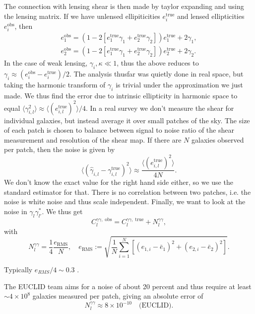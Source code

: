 \documentclass[11pt]{article} %
\newcommand{\br}[1]{\ensuremath{\left( #1 \right)}}
\newcommand{\sbr}[1]{\ensuremath{\left[ #1 \right]}}
\begin{document}
The connection with lensing shear is then made by taylor expanding and using the lensing matrix. If we have unlensed ellipiticities $e_i^\text{true}$ and lensed ellipticities $e_i^{\text{obs}}$, then \cite{dodelson_modern_cosmology}
\begin{gather*}
	e_1^{\text{obs}} = \br{1-2\sbr{e_1^{\text{true}}\gamma_1+e_2^{\text{true}}\gamma_2}}e_1^{\text{true}} + 2\gamma_1,\\
	e_2^{\text{obs}} = \br{1-2\sbr{e_1^{\text{true}}\gamma_1+e_2^{\text{true}}\gamma_2}}e_2^{\text{true}} + 2\gamma_2.
\end{gather*}
In the case of weak lensing, $\gamma_i, \kappa \ll 1$, thus the above reduces to $\gamma_i \approx (e_i^{\text{obs}} - e^{\text{true}}_i)/2$. The analysis thusfar was quietly done in real space, but taking the harmonic transform of $\gamma_i$ is trivial under the approximation we just made. We thus find the error due to intrinsic ellipticity in harmonic space to equal $ \langle \gamma_{i,l}^2\rangle \approx \langle \br{e_{i,l}^\text{true}}^2\rangle/4$. In a real survey we don't measure the shear for individual galaxies, but instead average it over small patches of the sky. The size of each patch is chosen to balance between signal to noise ratio of the shear measurement and resolution of the shear map. If there are $N$ galaxies observed per patch, then the noise is given by
$$
\langle \br{\hat \gamma_{i,l}  - \gamma_{i,l}^{\text{true}}}^2\rangle \approx \frac{\langle \br{e_{i,l}^\text{true}}^2\rangle}{4N}.
$$
We don't know the exact value for the right hand side either, so we use the standard estimator for that. There is no correlation between two patches, i.e. the noise is white noise and thus scale independent. Finally, we want to look at the noise in $\gamma_l\gamma_{l'}^*$. We thus get
\begin{equation*}
	C^{\gamma\gamma,\;\text{obs}}_l = C^{\gamma\gamma, \;\text{true}}_l + N_l^{\gamma\gamma},
\end{equation*} 
with
\begin{equation*}
	 N_l^{\gamma\gamma} = \frac{1}{4}\frac{e_{\text{RMS}}}{N}, \quad e_{\text{RMS}}:=\sqrt{\frac{1}{N}\sum^N_{i=1}\sbr{(e_{1, i} - \bar e_1)^2 + (e_{2,i}-\bar e_2)^2}}.
\end{equation*}

Typically $e_{RMS} / 4 \sim 0.3$ \cite{Kilbinger_2015}.

The EUCLID team aims for a noise of about 20 percent and thus require at least $\sim 4 \times 10^8$ galaxies measured per patch, giving an absolute error of \cite{2024}
$$
N_l^{\gamma\gamma} \approx 8 \times 10^{-10} \quad \text{(EUCLID)}.
$$
\end{document}
